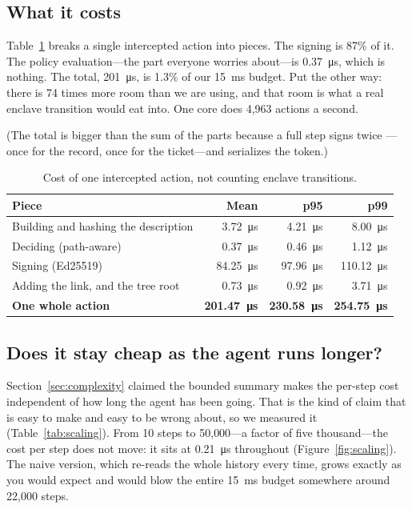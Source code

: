 \documentclass[11pt]{article}
\begin{document}
\subsection{What it costs}
Table~\ref{tab:latency} breaks a single intercepted action into pieces. The
signing is 87\% of it. The policy evaluation---the part everyone worries
about---is \SI{0.37}{\micro\second}, which is nothing. The total,
\SI{201}{\micro\second}, is 1.3\% of our \SI{15}{\milli\second} budget. Put
the other way: there is 74 times more room than we are using, and that room is
what a real enclave transition would eat into. One core does 4{,}963 actions a
second.

(The total is bigger than the sum of the parts because a full step signs twice
---once for the record, once for the ticket---and serializes the token.)

\begin{table}[ht]
\centering\small
\begin{tabular}{@{}lrrr@{}}
\toprule
\textbf{Piece} & \textbf{Mean} & \textbf{p95} & \textbf{p99} \\
\midrule
Building and hashing the description & \SI{3.72}{\micro\second} & \SI{4.21}{\micro\second} & \SI{8.00}{\micro\second} \\
Deciding (path-aware) & \SI{0.37}{\micro\second} & \SI{0.46}{\micro\second} & \SI{1.12}{\micro\second} \\
Signing (Ed25519) & \SI{84.25}{\micro\second} & \SI{97.96}{\micro\second} & \SI{110.12}{\micro\second} \\
Adding the link, and the tree root & \SI{0.73}{\micro\second} & \SI{0.92}{\micro\second} & \SI{3.71}{\micro\second} \\
\midrule
\textbf{One whole action} & \textbf{\SI{201.47}{\micro\second}} & \textbf{\SI{230.58}{\micro\second}} & \textbf{\SI{254.75}{\micro\second}} \\
\bottomrule
\end{tabular}
\caption{Cost of one intercepted action, not counting enclave transitions.}
\label{tab:latency}
\end{table}

\subsection{Does it stay cheap as the agent runs longer?}
Section~\ref{sec:complexity} claimed the bounded summary makes the per-step
cost independent of how long the agent has been going. That is the kind of
claim that is easy to make and easy to be wrong about, so we measured it
(Table~\ref{tab:scaling}). From 10 steps to 50{,}000---a factor of five thousand---the
cost per step does not move: it sits at \SI{0.21}{\micro\second} throughout
(Figure~\ref{fig:scaling}). The naive version, which re-reads the whole history
every time, grows exactly as you would expect and would blow the entire
\SI{15}{\milli\second} budget somewhere around 22{,}000 steps.
\end{document}
